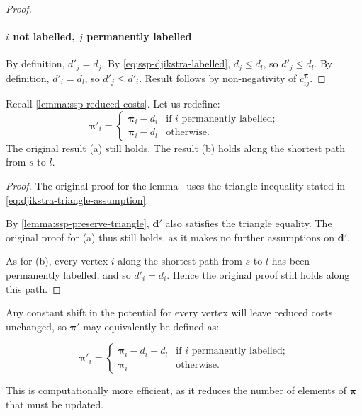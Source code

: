 \begin{proof}
    \paragraph{$i$ not labelled, $j$ permanently labelled} By definition, $d'_j = d_j$. By \cref{eq:ssp-djikstra-labelled}, $d_j \leq d_l$, so $d'_j \leq d_l$. By definition, $d'_i = d_l$, so $d'_j \leq d'_i$. Result follows by non-negativity of $c^{\boldsymbol{\pi}}_{ij}$.
\end{proof}

\begin{lemma}
    Recall \cref{lemma:ssp-reduced-costs}. Let us redefine:
    {\normalfont
        \[\boldsymbol{\pi}'_{i}=\begin{cases}
        \boldsymbol{\pi}_{i}-d_{i} & \textrm{if $i$ permanently labelled;}\\
        \boldsymbol{\pi}_{i}-d_{l} & \textrm{otherwise.}
        \end{cases}\]}\noindent
    The original result (a) still holds. The result (b) holds along the shortest path from $s$ to $l$\footnotemark.
\end{lemma}
\begin{proof}
    The original proof for the lemma~\cite[lemma~9.11]{Ahuja:1993} uses the triangle inequality stated in \cref{eq:djikstra-triangle-assumption}. 
    
    By \cref{lemma:ssp-preserve-triangle}, $\mathbf{d}'$ also satisfies the triangle equality. The original proof for (a) thus still holds, as it makes no further assumptions on $\mathbf{d}'$.
    
    As for (b), every vertex $i$ along the shortest path from $s$ to $l$ has been permanently labelled, and so $d'_i = d_i$. Hence the original proof still holds along this path.
\end{proof}

Any constant shift in the potential for every vertex will leave reduced costs unchanged, so $\boldsymbol{\pi}'$ may equivalently be defined as:

\[\boldsymbol{\pi}'_{i}=\begin{cases}
\boldsymbol{\pi}_{i}-d_i+d_l & \text{if $i$ permanently labelled;}\\
\boldsymbol{\pi}_{i} & \text{otherwise.}
\end{cases}\]

This is computationally more efficient, as it reduces the number of elements of $\boldsymbol{\pi}$ that must be updated.



